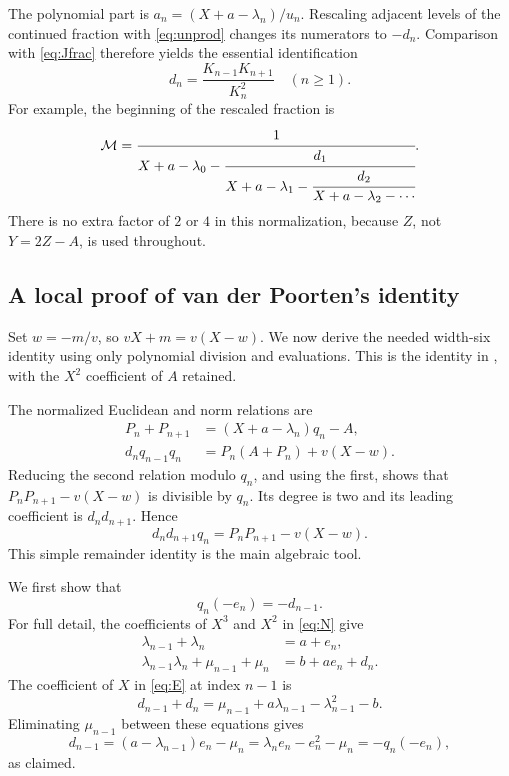 \documentclass[11pt,a4paper]{article}
\numberwithin{equation}{section}
\theoremstyle{definition}
\begin{document}
The polynomial part is
$a_n=(X+a-\lambda_n)/u_n$. Rescaling adjacent levels of the continued
fraction with \eqref{eq:unprod} changes its numerators to $-d_n$. Comparison
with \eqref{eq:Jfrac} therefore yields the essential identification
\begin{equation}\label{eq:dH}
 \boxed{\quad d_n=\frac{K_{n-1}K_{n+1}}{K_n^2}\quad(n\geq1).\quad}
\end{equation}
For example, the beginning of the rescaled fraction is
\[
 \mathcal M=\cfrac{1}{X+a-\lambda_0-
            \cfrac{d_1}{X+a-\lambda_1-
            \cfrac{d_2}{X+a-\lambda_2-\cdots}}}.
\]
There is no extra factor of $2$ or $4$ in this normalization, because $Z$,
not $Y=2Z-A$, is used throughout.

\subsection{A local proof of van der Poorten's identity}
Set $w=-m/v$, so $vX+m=v(X-w)$. We now derive the needed width-six identity
using only polynomial division and evaluations. This is the identity in
\cite[Theorem 3.1]{vdP2005}, with the $X^2$ coefficient of $A$ retained.

The normalized Euclidean and norm relations are
\begin{align}\label{eq:E}
 P_n+P_{n+1}&=(X+a-\lambda_n)q_n-A,\\
 d_nq_{n-1}q_n&=P_n(A+P_n)+v(X-w).\label{eq:N}
\end{align}
Reducing the second relation modulo $q_n$, and using the first, shows that
$P_nP_{n+1}-v(X-w)$ is divisible by $q_n$. Its degree is two and its leading
coefficient is $d_nd_{n+1}$. Hence
\begin{equation}\label{eq:cross}
 d_nd_{n+1}q_n=P_nP_{n+1}-v(X-w).
\end{equation}
This simple remainder identity is the main algebraic tool.

We first show that
\begin{equation}\label{eq:qeval}
 q_n(-e_n)=-d_{n-1}.
\end{equation}
For full detail, the coefficients of $X^3$ and $X^2$ in \eqref{eq:N} give
\begin{align}
 \lambda_{n-1}+\lambda_n&=a+e_n,\label{eq:coeff3}\\
 \lambda_{n-1}\lambda_n+\mu_{n-1}+\mu_n&=b+ae_n+d_n.\label{eq:coeff2}
\end{align}
The coefficient of $X$ in \eqref{eq:E} at index $n-1$ is
\begin{equation}\label{eq:coeff1}
 d_{n-1}+d_n=\mu_{n-1}+a\lambda_{n-1}-\lambda_{n-1}^2-b.
\end{equation}
Eliminating $\mu_{n-1}$ between these equations gives
\[
 d_{n-1}=(a-\lambda_{n-1})e_n-\mu_n
         =\lambda_ne_n-e_n^2-\mu_n=-q_n(-e_n),
\]
as claimed.
\end{document}

